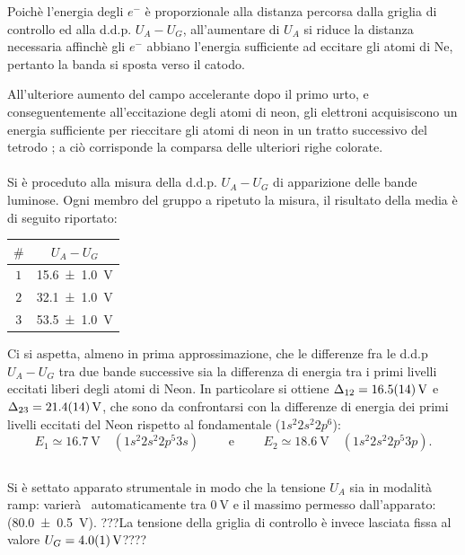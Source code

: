 		Poichè l'energia degli $e^{-}$ è proporzionale alla distanza 
		percorsa dalla griglia di controllo ed alla d.d.p. $U_A-U_G$,
		all'aumentare di $U_A$ si riduce
		la distanza necessaria affinchè gli $e^-$ abbiano l'energia sufficiente 
		ad eccitare gli atomi di Ne, pertanto la banda si sposta verso il catodo.
		
		All'ulteriore aumento del campo accelerante dopo il
		primo urto, e conseguentemente all'eccitazione degli 
		atomi di neon, gli elettroni acquisiscono un energia
		sufficiente per rieccitare gli atomi 
		di neon in un tratto successivo del tetrodo ;
		a ciò corrisponde la comparsa delle ulteriori righe colorate. 
\paragraph{}	
	Si è proceduto alla misura della d.d.p. $U_A-U_G$ di apparizione delle bande luminose. Ogni membro del gruppo a ripetuto la misura, il risultato della media è di seguito riportato:
	
	\begin{table}[H]
 		\centering
		\begin{tabular}{cc}
 			\toprule
 			$\#$  &  $U_A- U_G$\\
  			\midrule
  			$1$ & \SI{15.6 \pm 1.0}{\volt}\\
  			$2$ &  \SI{32.1 \pm 1.0}{\volt}\\
  			$3$ & \SI{53.5 \pm 1.0}{\volt}\\
  			\bottomrule
 		\end{tabular}
	\label{tab:a}
	\end{table}
	

	
	Ci si aspetta, almeno in prima approssimazione, che le differenze fra le d.d.p $U_A-U_G$ tra due bande successive sia la differenza di energia tra i primi livelli eccitati liberi degli atomi di Neon.
	In particolare si ottiene $\Delta_{12} = \SI{16.5 \pm 1.4}{\volt}$ e $\Delta_{23} = \SI{21.4 \pm 1.4}{\volt}$, che sono da confrontarsi con la differenze di energia dei primi livelli eccitati del Neon rispetto al fondamentale ($1s^2 2s^2 2p^6$): 
	$$E_1 \simeq \SI{16.7}{\volt} \quad (1s^2 2s^2 2p^5 3s) \qquad \text{ e } \qquad E_2 \simeq \SI{18.6}{\volt} \quad (1s^2 2s^2 2p^5 3p).$$

\subsection{}	
	Si è settato apparato strumentale in modo che
	la tensione $U_A$ sia in modalità  ramp: varierà  automaticamente tra $\SI{0}{\volt}$ e il massimo permesso dall'apparato:
	(\SI{80.0 \pm 0.5}{\volt}). ???La tensione della griglia di controllo è invece lasciata fissa al valore $U_G = \SI{4.0 \pm 0.1}{\volt}$????
	
